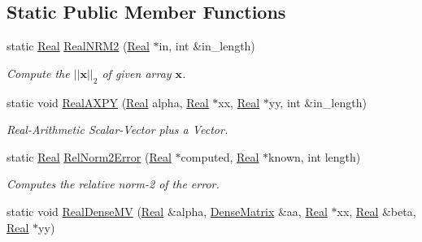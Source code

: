 \subsection*{Static Public Member Functions}
\begin{DoxyCompactItemize}
\item 
static \hyperlink{group__c01-roots_gac080bbbf5cbb5502c9f00405f894857d}{Real} \hyperlink{classmtk_1_1BLASAdapter_ab92440888b730863244c5d9479c11aca}{Real\+N\+R\+M2} (\hyperlink{group__c01-roots_gac080bbbf5cbb5502c9f00405f894857d}{Real} $\ast$in, int \&in\+\_\+length)
\begin{DoxyCompactList}\small\item\em Compute the $ ||\mathbf{x}||_2 $ of given array $ \mathbf{x} $. \end{DoxyCompactList}\item 
static void \hyperlink{classmtk_1_1BLASAdapter_a081cd092ae65e730f44eae8643edd539}{Real\+A\+X\+P\+Y} (\hyperlink{group__c01-roots_gac080bbbf5cbb5502c9f00405f894857d}{Real} alpha, \hyperlink{group__c01-roots_gac080bbbf5cbb5502c9f00405f894857d}{Real} $\ast$xx, \hyperlink{group__c01-roots_gac080bbbf5cbb5502c9f00405f894857d}{Real} $\ast$yy, int \&in\+\_\+length)
\begin{DoxyCompactList}\small\item\em Real-\/\+Arithmetic Scalar-\/\+Vector plus a Vector. \end{DoxyCompactList}\item 
static \hyperlink{group__c01-roots_gac080bbbf5cbb5502c9f00405f894857d}{Real} \hyperlink{classmtk_1_1BLASAdapter_af2ac5691f45e67d6e26186b071119ec4}{Rel\+Norm2\+Error} (\hyperlink{group__c01-roots_gac080bbbf5cbb5502c9f00405f894857d}{Real} $\ast$computed, \hyperlink{group__c01-roots_gac080bbbf5cbb5502c9f00405f894857d}{Real} $\ast$known, int length)
\begin{DoxyCompactList}\small\item\em Computes the relative norm-\/2 of the error. \end{DoxyCompactList}\item 
static void \hyperlink{classmtk_1_1BLASAdapter_afdcac059a4294287cb55638221220646}{Real\+Dense\+M\+V} (\hyperlink{group__c01-roots_gac080bbbf5cbb5502c9f00405f894857d}{Real} \&alpha, \hyperlink{classmtk_1_1DenseMatrix}{Dense\+Matrix} \&aa, \hyperlink{group__c01-roots_gac080bbbf5cbb5502c9f00405f894857d}{Real} $\ast$xx, \hyperlink{group__c01-roots_gac080bbbf5cbb5502c9f00405f894857d}{Real} \&beta, \hyperlink{group__c01-roots_gac080bbbf5cbb5502c9f00405f894857d}{Real} $\ast$yy)

\end{DoxyCompactItemize}
